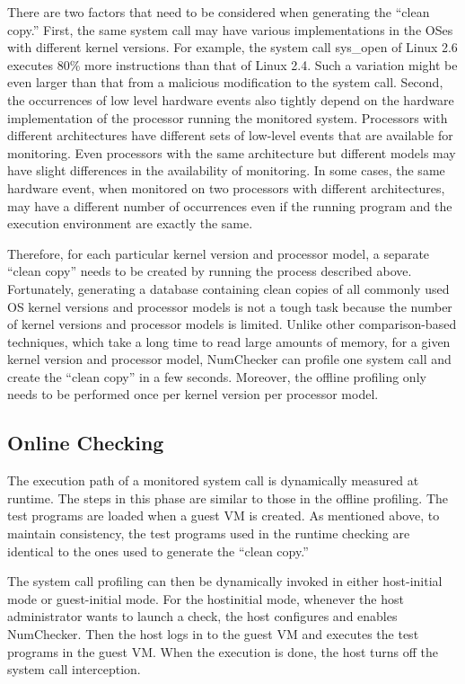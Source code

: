 \documentclass[12pt]{report}
\begin{document}
There are two factors that need to be considered when
generating the “clean copy.” First, the same system call may
have various implementations in the OSes with different kernel
versions. For example, the system call sys\_open of Linux 2.6
executes 80\% more instructions than that of Linux 2.4. Such
a variation might be even larger than that from a malicious
modification to the system call. Second, the occurrences of
low level hardware events also tightly depend on the hardware
implementation of the processor running the monitored
system. Processors with different architectures have different
sets of low-level events that are available for monitoring. Even
processors with the same architecture but different models may
have slight differences in the availability of monitoring. In
some cases, the same hardware event, when monitored on two
processors with different architectures, may have a different
number of occurrences even if the running program and the
execution environment are exactly the same.

Therefore, for each particular kernel version and processor
model,  a separate “clean copy” needs to be created by running
the process described above. Fortunately, generating a database
containing clean copies of all commonly used OS kernel
versions and processor models is not a tough task because the
number of kernel versions and processor models is limited.
Unlike other comparison-based techniques, which take a long
time to read large amounts of memory, for a given kernel
version and processor model, NumChecker can profile one
system call and create the “clean copy” in a few seconds.
Moreover, the offline profiling only needs to be performed
once per kernel version per processor model.

\subsection{Online Checking}
The execution path of a monitored
system call is dynamically measured at runtime. The steps in
this phase are similar to those in the offline profiling. The
test programs are loaded when a guest VM is created. As
mentioned above, to maintain consistency, the test programs
used in the runtime checking are identical to the ones used to
generate the “clean copy.”

The system call profiling can then be dynamically invoked
in either host-initial mode or guest-initial mode. For the hostinitial
mode, whenever the host administrator wants to launch
a check, the host configures and enables NumChecker. Then
the host logs in to the guest VM and executes the test programs
in the guest VM. When the execution is done, the host turns
off the system call interception.
\end{document}
